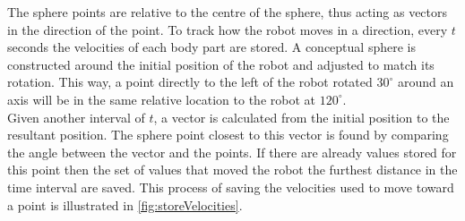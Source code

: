 \documentclass{article}
\begin{document}
The sphere points are relative to the centre of the sphere, thus acting as vectors in the direction of the point. To track how the robot moves in a direction, every $t$ seconds the velocities of each body part are stored. A conceptual sphere is constructed around the initial position of the robot and adjusted to match its rotation. This way, a point directly to the left of the robot rotated $30^\circ$ around an axis will be in the same relative location to the robot at $120^\circ$. \\
Given another interval of $t$, a vector is calculated from the initial position to the resultant position. The sphere point closest to this vector is found by comparing the angle between the vector and the points. 
If there are already values stored for this point then the set of values that moved the robot the furthest distance in the time interval are saved. This process of saving the velocities used to move toward a point is illustrated in \autoref{fig:storeVelocities}. 
\end{document}
